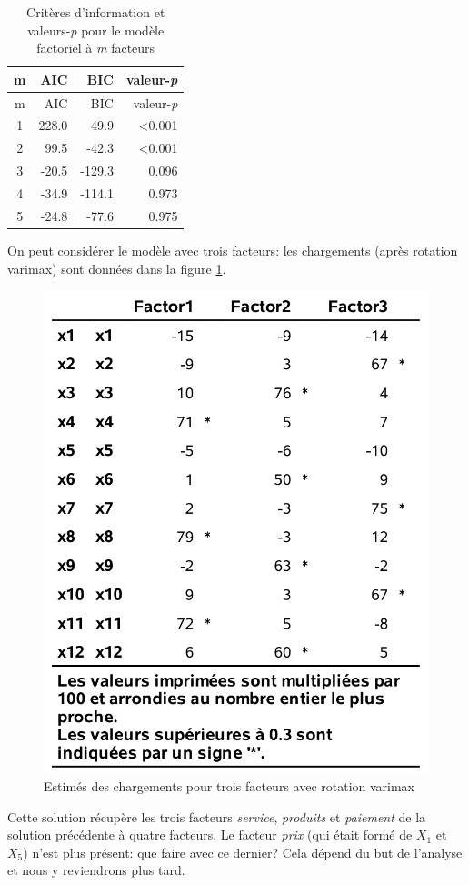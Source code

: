 \documentclass[
  11pt,
  letterpaper,
]{book}
\theoremstyle{definition}
\theoremstyle{definition}
\theoremstyle{definition}
\theoremstyle{remark}
\begin{document}
\begin{longtable}[]{@{}crrr@{}}
\caption{\label{tab:ICtable} Critères d'information et valeurs-\emph{p} pour le modèle factoriel à \emph{m} facteurs}\tabularnewline
\toprule
m & AIC & BIC & valeur-\emph{p} \\
\midrule
\endfirsthead
\toprule
m & AIC & BIC & valeur-\emph{p} \\
\midrule
\endhead
1 & 228.0 & 49.9 & \textless0.001 \\
2 & 99.5 & -42.3 & \textless0.001 \\
3 & -20.5 & -129.3 & 0.096 \\
4 & -34.9 & -114.1 & 0.973 \\
5 & -24.8 & -77.6 & 0.975 \\
\bottomrule
\end{longtable}

On peut considérer le modèle avec trois facteurs: les chargements (après rotation varimax) sont données dans la figure \ref{fig:fig1p5}.

\begin{figure}

{\centering \includegraphics[width=0.55\linewidth]{figures/01-facto-e5} 

}

\caption{Estimés des chargements pour trois facteurs avec rotation varimax}\label{fig:fig1p5}
\end{figure}

Cette solution récupère les trois facteurs \emph{service}, \emph{produits} et \emph{paiement} de la solution précédente à quatre facteurs. Le facteur \emph{prix} (qui était formé de \(X_1\) et \(X_5\)) n'est plus présent: que faire avec ce dernier? Cela dépend du but de l'analyse et nous y reviendrons plus tard.
\end{document}
